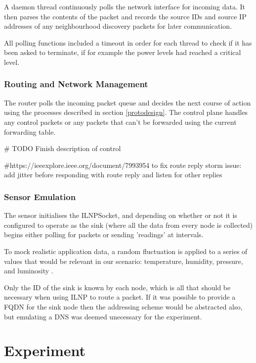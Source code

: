 \documentclass[12pt]{article}
\begin{document}
A daemon thread continuously polls the network interface for incoming data. It then parses the contents of the packet and records the source IDs and source IP addresses of any neighbourhood discovery packets for later communication. 

All polling functions included a timeout in order for each thread to check if it has been asked to terminate, if for example the power levels had reached a critical level.

\section{Routing and Network Management}

The router polls the incoming packet queue and decides the next course of action using the processes described in section \ref{protodesign}. The control plane handles any control packets or any packets that can't be forwarded using the current forwarding table.

\# TODO Finish description of control 

\#https://ieeexplore.ieee.org/document/7993954 to fix route reply storm issue: add jitter before responding with route reply and listen for other replies

\section{Sensor Emulation}

The sensor initialises the ILNPSocket, and depending on whether or not it is configured to operate as the sink (where all the data from every node is collected) begins either polling for packets or sending 'readings' at intervals.

To mock realistic application data, a random fluctuation is applied to a series of values that would be relevant in our scenario: temperature, humidity, pressure, and luminosity \cite{agrisensor}.

Only the ID of the sink is known by each node, which is all that should be necessary when using ILNP to route a packet. If it was possible to provide a FQDN for the sink node then the addressing scheme would be abstracted also, but emulating a DNS was deemed unecessary for the experiment.

\pagebreak
\part{Experiment}
\end{document}
